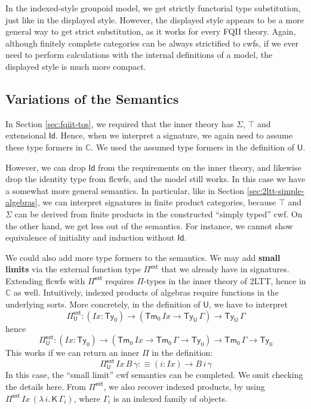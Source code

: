 \documentclass[12pt,a4paper,twoside,openany]{book}
\theoremstyle{remark}
\theoremstyle{definition}
\theoremstyle{theorem}
\newcommand{\mi}[1]{\mathit{#1}}
\newcommand{\mbb}[1]{\mathbb{#1}}
\newcommand{\bs}[1]{\boldsymbol{#1}}
\newcommand{\Ix}{\mi{Ix}}
\newcommand{\Tm}{\mathsf{Tm}}
\newcommand{\Ty}{\mathsf{Ty}}
\newcommand{\U}{\mathsf{U}}
\newcommand{\Id}{\mathsf{Id}}
\newcommand{\Pie}{\Pi^{\mathsf{ext}}}
\newcommand{\K}{\mathsf{K}}
\newcommand{\bU}{\bs{\U}}
\newcommand{\mbbC}{\mbb{C}}
\newcommand{\defn}{:\equiv}
\begin{document}
In the indexed-style groupoid model, we get strictly functorial type
substitution, just like in the displayed style. However, the displayed style
appears to be a more general way to get strict substitution, as it works for
every FQII theory. Again, although finitely complete categories can be always
strictified to cwfs, if we ever need to perform calculations with the
internal definitions of a model, the displayed style is much more compact.

\subsection{Variations of the Semantics}

In Section \ref{sec:fqiit-tos}, we required that the inner theory has $\Sigma$,
$\top$ and extensional $\Id$. Hence, when we interpret a signature, we again
need to assume these type formers in $\mbbC$. We used the assumed type formers
in the definition of $\bU$.

However, we can drop $\Id$ from the requirements on the inner theory, and
likewise drop the identity type from flcwfs, and the model still works. In this
case we have a somewhat more general semantics. In particular, like in Section
\ref{sec:2ltt-simple-algebras}, we can interpret signatures in finite product
categories, because $\top$ and $\Sigma$ can be derived from finite products in
the constructed ``simply typed'' cwf. On the other hand, we get less out of the
semantics. For instance, we cannot show equivalence of initiality and induction
without $\Id$.

We could also add more type formers to the semantics. We may add \textbf{small
  limits} via the external function type $\Pie$ that we already have in
signatures. Extending flcwfs with $\Pie$ requires $\Pi$-types in the inner
theory of 2LTT, hence in $\mbbC$ as well. Intuitively, indexed products of
algebras require functions in the underlying sorts. More concretely, in the
definition of $\bU$, we have to interpret
\[
  \Pie_{\bU} : (\Ix : \Ty_0) \to (\Tm_0\,\Ix \to \Ty_{\bU}\,\Gamma) \to \Ty_{\bU}\,\Gamma
\]
hence
\[
  \Pie_{\bU} : (\Ix : \Ty_0) \to (\Tm_0\,\Ix \to \Tm_0\,\Gamma \to \Ty_0) \to \Tm_0\,\Gamma \to \Ty_0
\]
This works if we can return an inner $\Pi$ in the definition:
\[
  \Pie_{\bU}\,\Ix\,B\,\gamma \defn (i : \Ix) \to B\,i\,\gamma
\]
In this case, the ``small limit'' cwf semantics can be completed. We omit
checking the details here. From $\Pie$, we also recover indexed products, by
using $\Pie\,\Ix\,(\lambda\,i.\,\K\,\Gamma_i)$, where $\Gamma_i$ is an indexed
family of objects.
\end{document}
